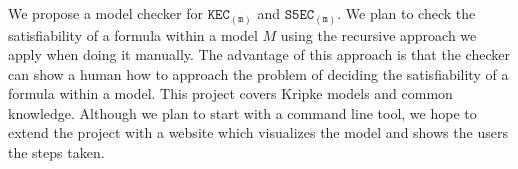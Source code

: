 
\noindent We propose a model checker for $\mathtt{KEC_{(m)}}$ and $\mathtt{S5EC_{(m)}}$.
% 
We plan to check the satisfiability of a formula within a model $M$ using the recursive approach we apply when doing it manually. The advantage of this approach is that the checker can show a human how to approach the problem of deciding the satisfiability of a formula within a model.
% 
This project covers Kripke models and common knowledge.
% 
Although we plan to start with a command line tool, we hope to extend the project with a website which visualizes the model and shows the users the steps taken. 